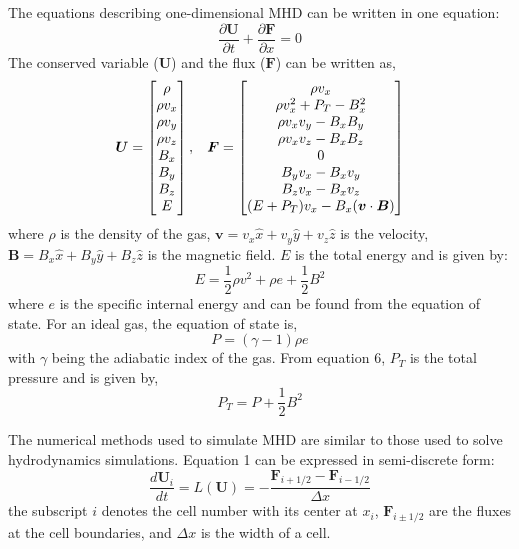 \documentclass{article}
\begin{document}
The equations describing one-dimensional MHD can be written in one equation:
\begin{equation}
    \frac{\partial \boldsymbol{U}}{\partial t} + \frac{\partial \boldsymbol{F}}{\partial x} = 0
\end{equation} 
The conserved variable ($\boldsymbol{U}$) and the flux ($\boldsymbol{F}$) can be written as, 
\begin{equation}
    \boldsymbol{U} = \begin{bmatrix} \rho \\ \rho v_x \\ \rho v_y \\
    \rho v_z \\ B_x \\ B_y \\ B_z \\ E\end{bmatrix},   \hspace{3mm}
    \boldsymbol{F}  = \begin{bmatrix} \rho v_x \\ \rho v_x^2 + P_T - B_x^2 \\ \rho v_x v_y -B_xB_y \\ \rho v_x v_z-B_xB_z \\ 0 \\ B_yv_x - B_xv_y \\ B_zv_x - B_xv_z \\ (E+P_T)v_x -B_x(\boldsymbol{v} \cdot \boldsymbol{B})\end{bmatrix}
\end{equation} 
where $\rho$ is the density of the gas, $\boldsymbol{v} = v_x \hat{x} +v_y \hat{y} + v_z \hat{z}$ is the velocity, $\boldsymbol{B} = B_x \hat{x} + B_y \hat{y} + B_z \hat{z}$ is the magnetic field. $E$ is the total energy and is given by:
\begin{equation}
    E = \frac{1}{2}\rho v^2 + \rho e + \frac{1}{2}B^2
\end{equation} 
where $e$ is the specific internal energy and can be found from the equation of state. For an ideal gas, the equation of state is,
\begin{equation}
    P=(\gamma-1)\rho e
\end{equation} 
with $\gamma$ being the adiabatic index of the gas. From equation 6, $P_T$ is the total pressure and is given by,
\begin{equation}
    P_T = P +\frac{1}{2}B^2
\end{equation} 

The numerical methods used to simulate MHD are similar to those used to solve hydrodynamics simulations. Equation 1 can be expressed in semi-discrete form:
\begin{equation}
    \frac{d\boldsymbol{U}_i}{dt} = L(\boldsymbol{U}) = - \frac{\boldsymbol{F}_{i+1/2} - \boldsymbol{F}_{i-1/2}}{\Delta x}
\end{equation}
the subscript $i$ denotes the cell number with its center at $x_i$, $\boldsymbol{F}_{i\pm 1/2}$ are the fluxes at the cell boundaries, and $\Delta x$ is the width of a cell.
\end{document}
